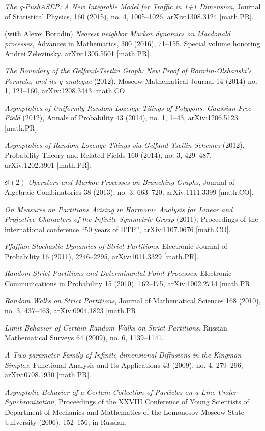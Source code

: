 \documentclass[letterpaper,11pt]{article}
\begin{document}
\begin{etaremune}
    \emph{The q-PushASEP: A New Integrable Model for Traffic in 1+1 Dimension},
    Journal of Statistical Physics,
    160 (2015), no. 4, 1005--1026,
    arXiv:1308.3124 [math.PR].
    \item (with Alexei Borodin) 
    \emph{Nearest neighbor Markov dynamics on 
    Macdonald processes},
    Advances in Mathematics, 300 (2016), 71--155. Special volume honoring Andrei Zelevinsky.
    arXiv:1305.5501 [math.PR].
    \item \emph{The Boundary of the Gelfand-Tsetlin Graph: New Proof of Borodin-Olshanski's Formula, and its q-analogue} (2012), 
    Moscow Mathematical Journal 14 (2014) no. 1, 121--160,
    arXiv:1208.3443 [math.CO].
    \item \emph{Asymptotics of Uniformly Random Lozenge Tilings of Polygons. Gaussian Free Field} (2012), 
    Annals of Probability 43 (2014), no. 1, 1--43,
    arXiv:1206.5123 [math.PR].
    \item \emph{Asymptotics of Random Lozenge Tilings via Gelfand-Tsetlin Schemes} (2012), 
    Probability Theory and Related Fields 160 (2014), no. 3, 429--487,
    arXiv:1202.3901 [math.PR].
    \item \emph{$\mathfrak{sl}(2)$ Operators and Markov Processes on Branching Graphs},
    Journal of Algebraic Combinatorics 38 (2013), no. 3, 663--720,
    arXiv:1111.3399 [math.CO].
    \item \emph{On Measures on Partitions Arising in Harmonic Analysis for Linear and Projective Characters of the Infinite Symmetric Group} (2011), Proceedings of the international conference ``50 years of IITP'', arXiv:1107.0676 [math.CO].
    \item  \emph{Pfaffian Stochastic Dynamics of Strict Partitions},  Electronic Journal of Probability 16 (2011), 2246--2295, arXiv:1011.3329 [math.PR].
    \item \emph{Random Strict Partitions and Determinantal Point Processes}, Electronic Communications in Probability 15 (2010), 162--175, arXiv:1002.2714 [math.PR].
    \item  \emph{Random Walks on Strict Partitions}, Journal of Mathematical Sciences 168 (2010), no. 3, 437--463, arXiv:0904.1823 [math.PR].  
    \item  \emph{Limit Behavior of Certain Random Walks on Strict Partitions}, Russian Mathematical Surveys 64 (2009), no. 6, 1139--1141.
    \item  \emph{A Two-parameter Family of Infinite-dimensional Diffusions in the Kingman Simplex}, Functional Analysis and Its Applications 43 (2009), no. 4, 279--296, arXiv:0708.1930 [math.PR].
     \item 
    \emph{Asymptotic Behavior of a Certain Collection of Particles on a Line Under Synchronization}, Proceedings of the XXVIII Conference of Young Scientists of Department of Mechanics and Mathematics of the Lomonosov Moscow State University (2006), 152--156, in Russian.
\end{etaremune}
\end{document}
